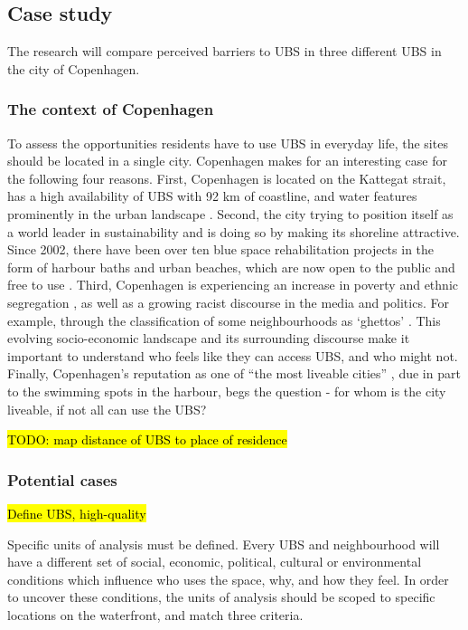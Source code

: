 \documentclass{article}
\begin{document}
\subsection{Case study}

The research will compare perceived barriers to UBS in three different UBS in the city of Copenhagen.

\subsubsection{The context of Copenhagen}

To assess the opportunities residents have to use UBS in everyday life, the sites should be located in a single city. Copenhagen makes for an interesting case for the following four reasons. First, Copenhagen is located on the Kattegat strait, has a high availability of UBS with 92 km of coastline, and water features prominently in the urban landscape \parencite{comertler2017greens}. Second, the city trying to position itself as a world leader in sustainability and is doing so by making its shoreline attractive. Since 2002, there have been over ten blue space rehabilitation projects in the form of harbour baths and urban beaches, which are now open to the public and free to use \parencite{visitcopenhagen_baths}. Third, Copenhagen is experiencing an increase in poverty and ethnic segregation \parencite{moller2015socioeconomic}, as well as a growing racist discourse in the media and politics. For example, through the classification of some neighbourhoods as ‘ghettos’ \parencite{simonsen2008practice}. This evolving socio-economic landscape and its surrounding discourse make it important to understand who feels like they can access UBS, and who might not. Finally, Copenhagen’s reputation as one of ``the most liveable cities'' \parencite{visitdenmark_2021}, due in part to the swimming spots in the harbour, begs the question - for whom is the city liveable, if not all can use the UBS?

\hl{TODO: map distance of UBS to place of residence}

\subsubsection{Potential cases}

\hl{Define UBS, high-quality}

Specific units of analysis must be defined. Every UBS and neighbourhood will have a different set of social, economic, political, cultural or environmental conditions which influence who uses the space, why, and how they feel. In order to uncover these conditions, the units of analysis should be scoped to specific locations on the waterfront, and match three criteria. 
\end{document}
